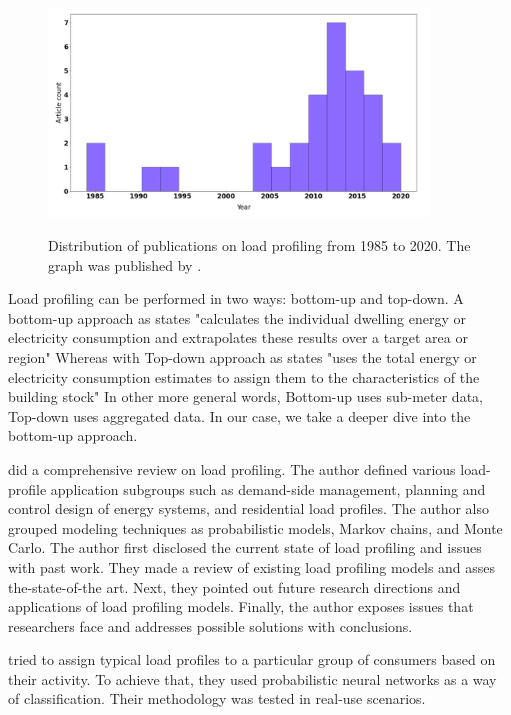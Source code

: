 \begin{figure}[H]
	\centering
	\caption{Distribution of publications on load profiling from 1985 to 2020. The graph was published by \protect\cite{Review2021}.}
	\includegraphics[width=0.9\textwidth]{Figures/publications.png}
	\label{fig:Distribution}
\end{figure}

Load profiling can be performed in two ways: bottom-up and top-down. 
A bottom-up approach as \cite{SWAN20091819} states "calculates the individual dwelling energy or electricity consumption and extrapolates these results over a target area or region"
Whereas with Top-down approach as \cite{SWAN20091819} states "uses the total energy or electricity consumption estimates to assign them to the characteristics of the building stock"
In other more general words, Bottom-up uses sub-meter data, Top-down uses aggregated data. 
In our case, we take a deeper dive into the bottom-up approach.

\cite{Review2021} did a comprehensive review on load profiling. The author defined various load-profile application
subgroups such as demand-side management, planning and control design of energy systems, and residential load profiles. The author also 
grouped modeling techniques as probabilistic models, Markov chains, and Monte Carlo. The author first disclosed the current state of load profiling and issues with past work.
They made a review of existing load profiling models
and asses the-state-of-the art. 
Next, they pointed out future research directions
and applications of load profiling models. Finally, the author exposes issues that researchers face and addresses possible solutions with conclusions.

\cite{GERBEC2005} tried to assign typical load profiles to a particular group of consumers based on their activity. 
To achieve that, they used probabilistic neural networks as a way of classification. Their methodology was tested in real-use scenarios. 

